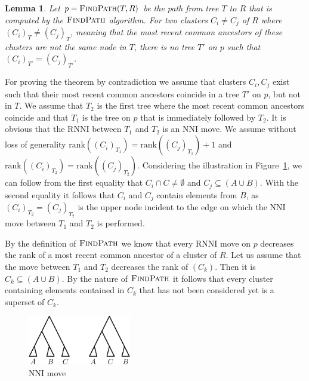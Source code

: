 \documentclass{amsart}
\newtheorem{lemma}{Lemma}
\newcommand{\rnni}{\mathrm{RNNI}}
\newcommand{\findpath}{\textsc{FindPath}}
\newcommand{\rank}{\mathrm{rank}}
\newcommand{\nni}{\mathrm{NNI}}
\begin{document}
\begin{lemma}
    Let $p = \findpath(T,R)$ be the path from tree $T$ to $R$ that is computed by the $\findpath$ algorithm.
    For two clusters $C_i \neq C_j$ of $R$ where $(C_i)_T \neq (C_j)_T$, meaning that the most recent common ancestors of these clusters are not the same node in $T$, there is no tree $T'$ on $p$ such that $(C_i)_{T'} = (C_j)_{T'}$.
\end{lemma}

\proof

For proving the theorem by contradiction we assume that clusters $C_i, C_j$ exist such that their most recent common ancestors coincide in a tree $T'$ on $p$, but not in $T$.
We assume that $T_2$ is the first tree where the most recent common ancestors coincide and that $T_1$ is the tree on $p$ that is immediately followed by $T_2$.
It is obvious that the $\rnni$ between $T_1$ and $T_2$ is an $\nni$ move.
We assume without loss of generality $\rank((C_i)_{T_1}) = \rank((C_j)_{T_1}) + 1$ and $\rank((C_i)_{T_2}) = \rank((C_j)_{T_2})$.
Considering the illustration in Figure~\ref{fig:nni_move}, we can follow from the first equality that $C_i \cap C \neq \emptyset$ and $C_j \subseteq (A \cup B)$.
With the second equality it follows that $C_i$ and $C_j$ contain elements from $B$, as $(C_i)_{T_2} = (C_j)_{T_2}$ is the upper node incident to the edge on which the $\nni$ move between $T_1$ and $T_2$ is performed.

By the definition of $\findpath$ we know that every $\rnni$ move on $p$ decreases the rank of a most recent common ancestor of a cluster of $R$.
Let us assume that the move between $T_1$ and $T_2$ decreases the rank of $(C_k)$.
Then it is $C_k \subseteq (A \cup B)$.
By the nature of $\findpath$ it follows that every cluster containing elements contained in $C_k$ that has not been considered yet is a superset of $C_k$.



\begin{figure}[H]
\centering
\includegraphics[width=0.4\textwidth]{NNI_move}
\vspace{12pt}
\caption{$\nni$ move}
\label{fig:nni_move}
\end{figure}
\end{document}
